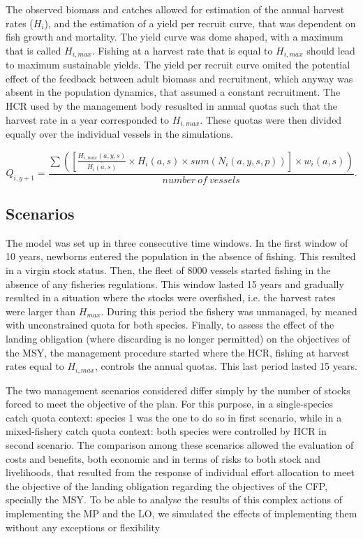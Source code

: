 \documentclass[12pt,oneline,a4paper,numbib]{ouparticle}
\numberwithin{equation}{subsection} %
\begin{document}
The observed biomass and catches allowed for estimation of the annual harvest rates ($H_i$), and the estimation of a yield per recruit curve, that was dependent on fish growth and mortality. The yield curve was dome shaped, with a maximum that is called $H_{i,max}$. Fishing at a harvest rate that is equal to $H_{i,max}$  should lead to maximum sustainable yields. The yield per recruit curve omited the potential effect of the feedback between adult biomass and recruitment, which anyway was absent in the population dynamics, that assumed a constant recruitment. The HCR used by the management body resuslted in annual quotas such that the harvest rate in a year corresponded to $H_{i,max}$. These quotas were then divided equally over the individual vessels in the simulations.  

\begin{equation}
 Q_{i,y+1} = \frac
                {\sum( [\frac{H_{i,max}(a,y,s)}{\bar{H_i(a,s)}} \times H_i(a,s) \times sum( N_i (a, y, s, p))] \times w_i(a,s)) }
                {number\  of\  vessels}.
\end{equation}


\subsection{Scenarios}

The model was set up in three consecutive time windows. In the first window of 10 years, newborns entered the population in the absence of fishing. This resulted in a virgin stock status. Then, the fleet of 8000 vessels started fishing in the absence of any fisheries regulations. This window lasted 15 years and gradually resulted in a situation where the stocks were overfished, i.e. the harvest rates were larger than $H_{max}$. During this period the fishery was unmanaged, by meaned with unconstrained quota for both species. Finally, to assess the effect of the landing obligation (where discarding is no longer permitted) on the objectives of the MSY, the management procedure started where the HCR, fishing at harvest rates equal to $H_{i,max}$, controls the annual quotas. This last period lasted 15 years. 
      
The two management scenarios considered differ simply by the number of stocks forced to meet the objective of the plan. For this purpose, in a single-species catch quota context: species 1 was the one to do so in first scenario, while in a mixed-fishery catch quota context: both species were controlled by HCR in second scenario. The comparison among these scenarios allowed the evaluation of costs and benefits, both economic and in terms of risks to both stock and livelihoods, that resulted from the response of individual effort allocation to meet the objective of the landing obligation regarding the objectives of the CFP, specially the MSY. To be able to analyse the results of this complex actions of implementing the MP and the LO, we simulated the effects of implementing them without any exceptions or flexibility
 
\end{document}
